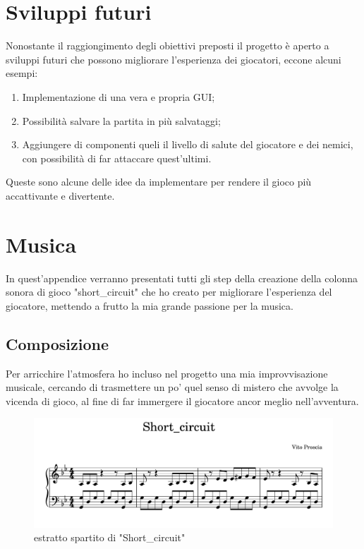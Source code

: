 \documentclass[italian,12pt,a4paper]{article}
\begin{document}
	\section{Sviluppi futuri}
	
	Nonostante il raggiongimento degli obiettivi preposti il progetto è aperto a sviluppi futuri che possono migliorare l'esperienza dei giocatori, eccone alcuni esempi:
	
	\begin{enumerate}
		\item Implementazione di una vera e propria GUI;
		\item Possibilità salvare la partita in più salvataggi;
		\item Aggiungere di componenti queli il livello di salute del giocatore e dei nemici, con possibilità di far attaccare quest'ultimi.
	\end{enumerate}
	Queste sono alcune delle idee da implementare per rendere il gioco più accattivante e divertente.
	\appendix
	\section{Musica}\label{appendix:musica}
	In quest'appendice verranno presentati tutti gli step della creazione della colonna sonora di gioco "short\_circuit" che ho creato per migliorare l'esperienza del giocatore, mettendo a frutto la mia grande passione per la musica.
	\subsection{Composizione}
	
	Per arricchire l'atmosfera ho incluso nel progetto una mia improvvisazione musicale, cercando di trasmettere un po' quel senso di mistero che avvolge la vicenda di gioco, al fine di far immergere il giocatore ancor meglio nell'avventura.
	
	\begin{figure}[!h]
		\centering
		\includegraphics[width=14cm]{score}
		\caption{estratto spartito di "Short\_circuit"}
		\label{fig:score}
	\end{figure}
	
\end{document}
